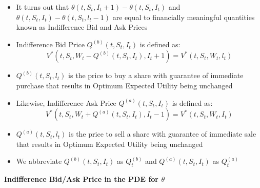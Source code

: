 \documentclass[10pt]{article}
\begin{document}
\begin{itemize} 
    \item It turns out that $\theta\left(t, S_{t}, I_{t}+1\right)-\theta\left(t, S_{t}, I_{t}\right)$ and $\theta\left(t, S_{t}, I_{t}\right)-\theta\left(t, S_{t}, l_{t}-1\right)$ are equal to financially meaningful quantities known as Indifference Bid and Ask Prices
    \item Indifference Bid Price $Q^{(b)}\left(t, S_{t}, I_{t}\right)$ is defined as:
    \[
    V^{*}\left(t, S_{t}, W_{t}-Q^{(b)}\left(t, S_{t}, I_{t}\right), I_{t}+1\right)=V^{*}\left(t, S_{t}, W_{t}, l_{t}\right) \tag{2}
    \]
    \item $Q^{(b)}\left(t, S_{t}, l_{t}\right)$ is the price to buy a share with guarantee of immediate purchase that results in Optimum Expected Utility being unchanged
    \item Likewise, Indifference Ask Price $Q^{(a)}\left(t, S_{t}, I_{t}\right)$ is defined as:
    \[
    V^{*}\left(t, S_{t}, W_{t}+Q^{(a)}\left(t, S_{t}, I_{t}\right), I_{t}-1\right)=V^{*}\left(t, S_{t}, W_{t}, I_{t}\right) \tag{3}
    \]
    \item $Q^{(a)}\left(t, S_{t}, l_{t}\right)$ is the price to sell a share with guarantee of immediate sale that results in Optimum Expected Utility being unchanged
    \item We abbreviate $Q^{(b)}\left(t, S_{t}, I_{t}\right)$ as $Q_{t}^{(b)}$ and $Q^{(a)}\left(t, S_{t}, I_{t}\right)$ as $Q_{t}^{(a)}$
\end{itemize}

\textbf{Indifference Bid/Ask Price in the PDE for $\theta$}
\end{document}

